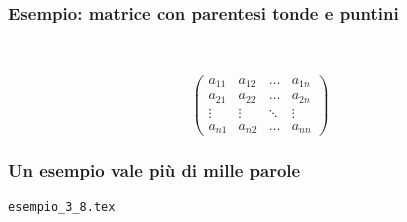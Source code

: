 \documentclass[svgnames,%
	ucs,%
	pdftex]{guitbeamer}
\begin{document}
\begin{frame}
  \frametitle{Esempio: matrice con parentesi tonde e puntini}
	\begin{LaTeXcode}
		\\[\n
		\alert{\\begin\{pmatrix\}}\n
		\hspace*{5ex} a\_\{11\}\ \& a\_\{12\}\ \& \\dots \& a\_\{1n\}\bs\bs\n
		\hspace*{5ex} a\_\{21\}\ \& a\_\{22\}\ \& \alert{\\dots} \& a\_\{2n\} \bs\bs\n
		\hspace*{5ex} \\vdots \& \\vdots \& \alert{\\ddots} \& \alert{\\vdots} \bs\bs\n
		\hspace*{5ex} a\_\{n1\}\ \& a\_\{n2\}\ \& \\dots \& a\_\{nn\}\bs\bs\n
		\alert{\\end\{pmatrix\}}\n
		\\]
	\end{LaTeXcode}
	\begin{LaTeXoutput}
		\[
		\begin{pmatrix}
		a_{11} & a_{12} & \dots & a_{1n} \\
		a_{21} & a_{22} & \dots & a_{2n} \\
		\vdots & \vdots & \ddots & \vdots \\
		a_{n1} & a_{n2} & \dots & a_{nn}
		\end{pmatrix}
		\]
	\end{LaTeXoutput}
\end{frame}
\begin{frame}
  \frametitle{Un esempio vale pi\`u di mille parole}
	\begin{center}
		\alert{\texttt{esempio\_3\_8.tex}}
	\end{center}
\end{frame}
\end{document}

